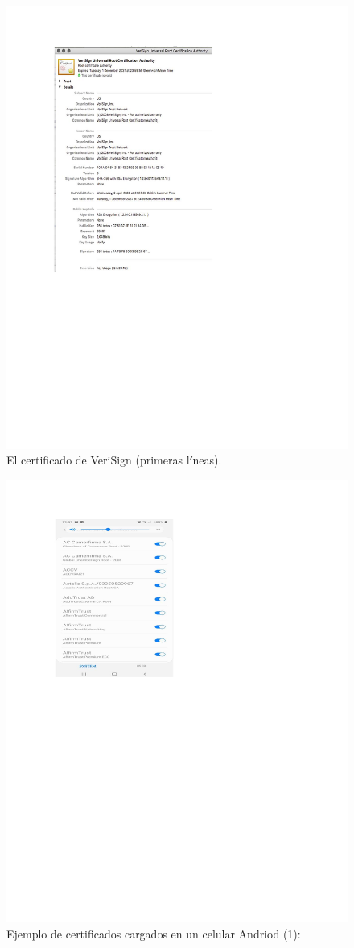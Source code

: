 \documentclass[12pt]{report} %
\begin{document}
\begin{figure}
\centering
\includegraphics[width=0.85\columnwidth]{imagenes/certifverisignej.pdf}
\caption{El certificado de VeriSign (primeras líneas).}
\label{Fig.ejemplocertificadoVerisign}
\end{figure} 



\begin{figure}
\centering
\includegraphics[width=0.85\columnwidth]{imagenes/certifenandroid.pdf}
\caption{Ejemplo de certificados cargados en un celular Andriod (1):}
\label{Fig.ejemplocertificadonAndroid}
\end{figure} 
\end{document}
